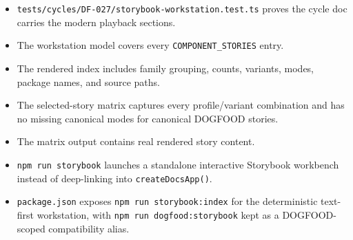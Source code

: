 \begin{itemize}
\tightlist
\item
  \texttt{t\allowbreak{}e\allowbreak{}s\allowbreak{}t\allowbreak{}s\allowbreak{}/\allowbreak{}c\allowbreak{}y\allowbreak{}c\allowbreak{}l\allowbreak{}e\allowbreak{}s\allowbreak{}/\allowbreak{}D\allowbreak{}F\allowbreak{}-\allowbreak{}0\allowbreak{}2\allowbreak{}7\allowbreak{}/\allowbreak{}s\allowbreak{}t\allowbreak{}o\allowbreak{}r\allowbreak{}y\allowbreak{}b\allowbreak{}o\allowbreak{}o\allowbreak{}k\allowbreak{}-\allowbreak{}w\allowbreak{}o\allowbreak{}r\allowbreak{}k\allowbreak{}s\allowbreak{}t\allowbreak{}a\allowbreak{}t\allowbreak{}i\allowbreak{}o\allowbreak{}n\allowbreak{}.\allowbreak{}t\allowbreak{}e\allowbreak{}s\allowbreak{}t\allowbreak{}.\allowbreak{}t\allowbreak{}s} proves the cycle doc carries the modern playback sections.
\item
  The workstation model covers every \texttt{C\allowbreak{}O\allowbreak{}M\allowbreak{}P\allowbreak{}O\allowbreak{}N\allowbreak{}E\allowbreak{}N\allowbreak{}T\allowbreak{}\_\allowbreak{}S\allowbreak{}T\allowbreak{}O\allowbreak{}R\allowbreak{}I\allowbreak{}E\allowbreak{}S} entry.
\item
  The rendered index includes family grouping, counts, variants, modes, package names, and source paths.
\item
  The selected-story matrix captures every profile/variant combination and has no missing canonical modes for canonical DOGFOOD stories.
\item
  The matrix output contains real rendered story content.
\item
  \texttt{n\allowbreak{}p\allowbreak{}m\allowbreak{} \allowbreak{}r\allowbreak{}u\allowbreak{}n\allowbreak{} \allowbreak{}s\allowbreak{}t\allowbreak{}o\allowbreak{}r\allowbreak{}y\allowbreak{}b\allowbreak{}o\allowbreak{}o\allowbreak{}k} launches a standalone interactive Storybook workbench instead of deep-linking into \texttt{c\allowbreak{}r\allowbreak{}e\allowbreak{}a\allowbreak{}t\allowbreak{}e\allowbreak{}D\allowbreak{}o\allowbreak{}c\allowbreak{}s\allowbreak{}A\allowbreak{}p\allowbreak{}p\allowbreak{}(\allowbreak{})}.
\item
  \texttt{p\allowbreak{}a\allowbreak{}c\allowbreak{}k\allowbreak{}a\allowbreak{}g\allowbreak{}e\allowbreak{}.\allowbreak{}j\allowbreak{}s\allowbreak{}o\allowbreak{}n} exposes \texttt{n\allowbreak{}p\allowbreak{}m\allowbreak{} \allowbreak{}r\allowbreak{}u\allowbreak{}n\allowbreak{} \allowbreak{}s\allowbreak{}t\allowbreak{}o\allowbreak{}r\allowbreak{}y\allowbreak{}b\allowbreak{}o\allowbreak{}o\allowbreak{}k\allowbreak{}:\allowbreak{}i\allowbreak{}n\allowbreak{}d\allowbreak{}e\allowbreak{}x} for the deterministic text-first workstation, with \texttt{n\allowbreak{}p\allowbreak{}m\allowbreak{} \allowbreak{}r\allowbreak{}u\allowbreak{}n\allowbreak{} \allowbreak{}d\allowbreak{}o\allowbreak{}g\allowbreak{}f\allowbreak{}o\allowbreak{}o\allowbreak{}d\allowbreak{}:\allowbreak{}s\allowbreak{}t\allowbreak{}o\allowbreak{}r\allowbreak{}y\allowbreak{}b\allowbreak{}o\allowbreak{}o\allowbreak{}k} kept as a DOGFOOD-scoped compatibility alias.
\end{itemize}

